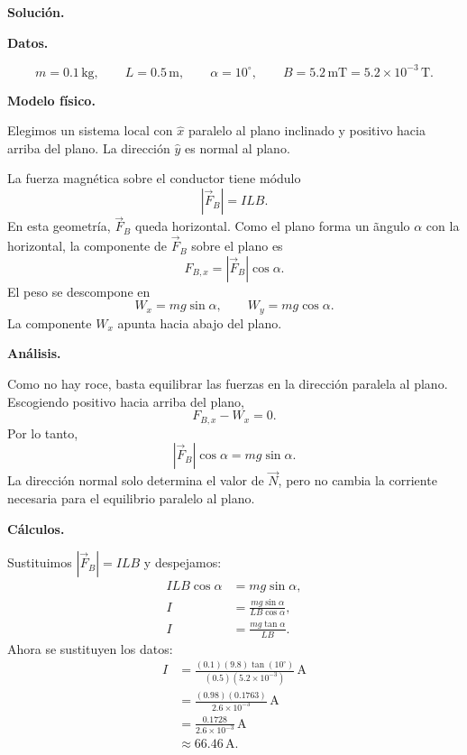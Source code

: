 \documentclass[11pt]{article}
\newcommand{\soluciontitulo}{%
  \par\medskip
  \noindent\textbf{Solución.}\par
  \smallskip
}
\begin{document}
\soluciontitulo

\par\medskip\noindent\textbf{Datos.}\par\smallskip
\begin{equation*}
    m=0.1\,\mathrm{kg},
    \qquad
    L=0.5\,\mathrm m,
    \qquad
    \alpha=10^\circ,
    \qquad
    B=5.2\,\mathrm{mT}=5.2\times10^{-3}\,\mathrm T.
\end{equation*}

\par\medskip\noindent\textbf{Modelo físico.}\par\smallskip
Elegimos un sistema local con $\hat x$ paralelo al plano inclinado y positivo hacia arriba del plano. La direcci\'on $\hat y$ es normal al plano.

La fuerza magn\'etica sobre el conductor tiene m\'odulo
\begin{equation*}
    |\vec F_B|=ILB.
\end{equation*}
En esta geometr\'ia, $\vec F_B$ queda horizontal. Como el plano forma un \~angulo $\alpha$ con la horizontal, la componente de $\vec F_B$ sobre el plano es
\begin{equation*}
    F_{B,x}=|\vec F_B|\cos\alpha.
\end{equation*}
El peso se descompone en
\begin{equation*}
    W_x=mg\sin\alpha,
    \qquad
    W_y=mg\cos\alpha.
\end{equation*}
La componente $W_x$ apunta hacia abajo del plano.

\par\medskip\noindent\textbf{Análisis.}\par\smallskip
Como no hay roce, basta equilibrar las fuerzas en la direcci\'on paralela al plano. Escogiendo positivo hacia arriba del plano,
\begin{equation*}
    F_{B,x}-W_x=0.
\end{equation*}
Por lo tanto,
\begin{equation*}
    |\vec F_B|\cos\alpha=mg\sin\alpha.
\end{equation*}
La direcci\'on normal solo determina el valor de $\vec N$, pero no cambia la corriente necesaria para el equilibrio paralelo al plano.

\par\medskip\noindent\textbf{Cálculos.}\par\smallskip
Sustituimos $|\vec F_B|=ILB$ y despejamos:
\begin{align*}
    ILB\cos\alpha&=mg\sin\alpha,\\
    I&=\frac{mg\sin\alpha}{LB\cos\alpha},\\
    I&=\frac{mg\tan\alpha}{LB}.
\end{align*}
Ahora se sustituyen los datos:
\begin{align*}
    I&=\frac{(0.1)(9.8)\tan(10^\circ)}{(0.5)(5.2\times10^{-3})}\,\mathrm A\\
     &=\frac{(0.98)(0.1763)}{2.6\times10^{-3}}\,\mathrm A\\
     &=\frac{0.1728}{2.6\times10^{-3}}\,\mathrm A\\
     &\approx66.46\,\mathrm A.
\end{align*}
\end{document}
